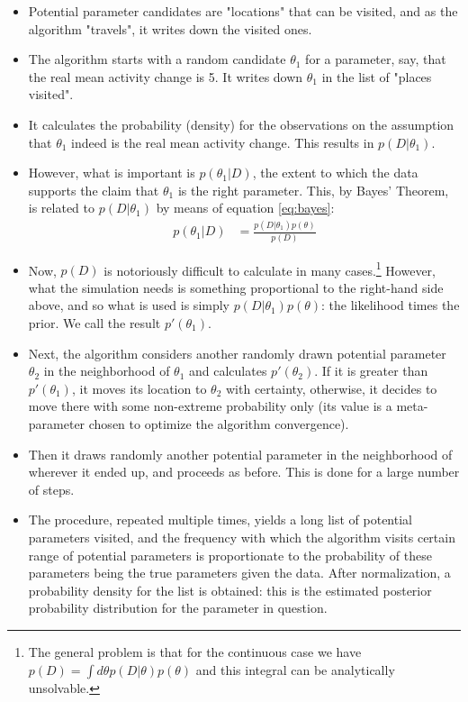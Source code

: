 \documentclass[10pt,]{scrartcl}
\begin{document}
\begin{itemize}
\item Potential parameter  candidates are "locations"  that can be visited, and as the algorithm "travels", it writes down the  visited ones.
\item The algorithm starts with a random candidate $\theta_1$ for a parameter, say, that the real mean activity change is 5. It writes down $\theta_1$ in the list of "places visited".
\item It calculates the probability (density) for the observations  on the assumption that $\theta_1$ indeed is the real mean activity change. This results in $p(D\vert \theta_1)$.
\item  However, what is important is $p(\theta_1\vert D)$, the extent to which the data supports the claim that $\theta_1$ is the right parameter. This, by Bayes' Theorem, is related to $p(D\vert \theta_1)$ by means of equation \eqref{eq:bayes}:
\begin{align}\label{eq:bayes}
p(\theta_1\vert D) & = \frac{p(D\vert \theta_1)p(\theta)}{p(D)}
\end{align}
\item Now, $p(D)$ is notoriously difficult to calculate in many cases.\footnote{The general problem is that  for the continuous case we have $p(D) = \int d \theta p(D\vert \theta) p (\theta)$ and this integral can be analytically unsolvable.}
However,  what the simulation needs is something proportional to the right-hand side above, and so what is used is simply $p(D\vert \theta_1)p(\theta)$: the likelihood times the prior. We call the result $p'(\theta_1)$.
\item Next, the algorithm considers another randomly drawn potential parameter $\theta_2$ in the neighborhood of $\theta_1$ and calculates $p'(\theta_2)$. If it is greater than $p'(\theta_1)$, it moves its location to $\theta_2$ with certainty, otherwise, it decides to move there with some non-extreme probability only (its value is a meta-parameter chosen to optimize the algorithm convergence).
\item Then it draws randomly another potential parameter in the neighborhood of wherever it ended up, and proceeds as before. This is done for a large number of steps. 
\item The procedure, repeated multiple  times, yields a long list of potential parameters visited, and the frequency with which the algorithm visits certain range of potential parameters is proportionate to the probability of these parameters being the true parameters given the data. After normalization,  a probability density for the list is obtained: this is the estimated posterior probability distribution  for the parameter in question.
\end{itemize}
\end{document}

